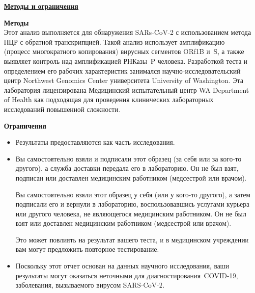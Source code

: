 \documentclass[10pt]{article}
\begin{document}
\bigskip

\large \underline{\textbf{Методы и ограничения}}

\textbf{Методы}\\
Этот анализ выполняется для обнаружения SARs-CoV-2 с использованием метода ПЦР с
обратной транскрипцией. Такой анализ использует амплификацию (процесс
многократного копирования) вирусных сегментов ORf1B и S, а также выявляет
контроль над амплификацией РНКазы P человека. Разработкой теста и определением
его рабочих характеристик занимался научно-исследовательский центр Northwest
Genomics Center университета University of Washington. Эта лаборатория
лицензирована Медицинский испытательный центр WA Department of Health как
подходящая для проведения клинических лабораторных исследований повышенной
сложности.

\textbf{Ограничения}

\begin{itemize}

\item

  Результаты предоставляются как часть исследования.

\item
  Вы самостоятельно взяли и подписали этот образец (за себя или за кого-то
  другого), а служба доставки передала его в лабораторию. Он не был взят,
  подписан или доставлен медицинским работником (медсестрой или врачом).

  Вы самостоятельно взяли этот образец у себя (или у кого-то другого), а затем
  подписали его и вернули в лабораторию, воспользовавшись услугами курьера или
  другого человека, не являющегося медицинским работником. Он не был взят или
  доставлен медицинским работником (медсестрой или врачом). 



  Это может повлиять на результат вашего теста, и в медицинском учреждении вам
  могут предложить повторное тестирование.

\item

  Поскольку этот отчет основан на данных научного исследования, ваши результаты
  могут оказаться неточными для диагностирования COVID-19, заболевания,
  вызываемого вирусом SARS-CoV-2.

\end{itemize}
\end{document}
